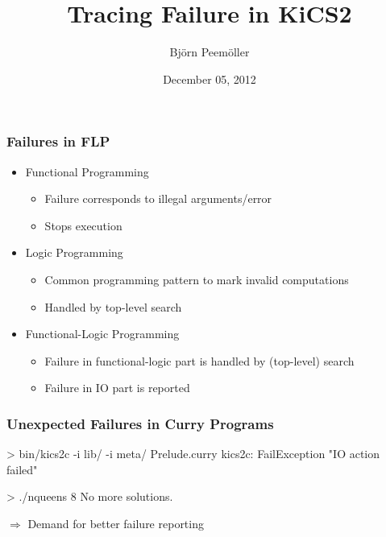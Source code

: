 \documentclass[
,xcolor=dvipsnames
]{beamer}
\title{Tracing Failure in KiCS2}
\date{December 05, 2012}
\author{Björn Peemöller}
\institute{Kiel University}
\newcommand{\ergo}{$\Rightarrow$}
\begin{document}
\begin{frame}[fragile]%
\titlepage
\end{frame}


\begin{frame}[fragile]%
\frametitle{Failures in FLP}

\begin{itemize}

\item Functional Programming
\begin{itemize}
\item Failure corresponds to illegal arguments/error
\item Stops execution
\end{itemize}

\item Logic Programming
\begin{itemize}
\item Common programming pattern to mark invalid computations
\item Handled by top-level search
\end{itemize}

\item Functional-Logic Programming
\begin{itemize}
\item Failure in functional-logic part is handled by (top-level) search
\item Failure in IO part is reported
\end{itemize}

\end{itemize}
\end{frame}


\begin{frame}[fragile]%
\frametitle{Unexpected Failures in Curry Programs}

\begin{example}
\begin{program}
> bin/kics2c -i lib/ -i meta/ Prelude.curry
kics2c: FailException "{}IO action failed"
\end{program}
\end{example}

\pause
\medskip

\begin{example}
\begin{program}
> ./nqueens 8
No more solutions.
\end{program}
\end{example}

\pause
\medskip

\begin{center}
\ergo{} Demand for better failure reporting
\end{center}
\end{frame}
\end{document}
